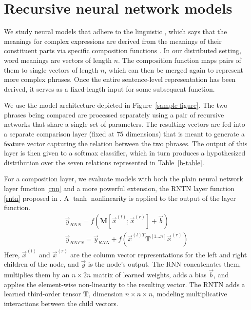 
\section{Recursive neural network models} \label{methods}

We study neural models that adhere to the linguistic , which says that the meanings for complex
expressions are derived from the meanings of their constituent parts
via specific composition functions \cite{Partee84,Janssen97}. In our
distributed setting, word meanings are vectors of length $n$. The
composition function maps pairs of them to single vectors of length $n$, 
which can then be merged again to represent more complex
phrases. Once the entire sentence-level representation has been
derived, it serves as a fixed-length input for some subsequent function.

We use the model architecture depicted in Figure~\ref{sample-figure}. 
The two phrases being compared are processed separately using a pair 
of recursive networks that share a single set of parameters. 
The resulting vectors are fed into a separate comparison
layer (fixed at 75 dimensions) that is meant to generate a feature vector capturing the
relation between the two phrases. The output of this layer is then
given to a softmax classifier, which in turn produces a hypothesized
distribution over the seven relations represented in Table~\ref{b-table}.

For a composition layer, we evaluate models with both the plain neural
network layer function \eqref{rnn} and a more powerful extension, the RNTN layer function
\eqref{rntn} proposed in . A $\tanh$ nonlinearity is applied to the output of the layer function.
%
\begin{gather} \label{rnn}
\vec{y}_{\textit{RNN}} = f(\mathbf{M} [\vec{x}^{(l)}; \vec{x}^{(r)}] + \vec{b}) \\
\label{rntn}
\vec{y}_{\textit{RNTN}} = \vec{y}_{\textit{RNN}} + f(\vec{x}^{(l)T} \mathbf{T}^{[1 \ldots n]} \vec{x}^{(r)})
\end{gather} 
%
Here, $\vec{x}^{(l)}$ and $\vec{x}^{(r)}$ are the column vector
representations for the left and right children of the node, and
$\vec{y}$ is the node's output.  The RNN concatenates them, multiplies
them by an $n \times 2n$ matrix of learned weights, adds a bias $\vec{b}$, and applies the
element-wise non-linearity to the resulting vector. The RNTN adds a learned third-order tensor 
$\mathbf{T}$, dimension $n \times n \times n$, modeling
multiplicative interactions between the child vectors.

